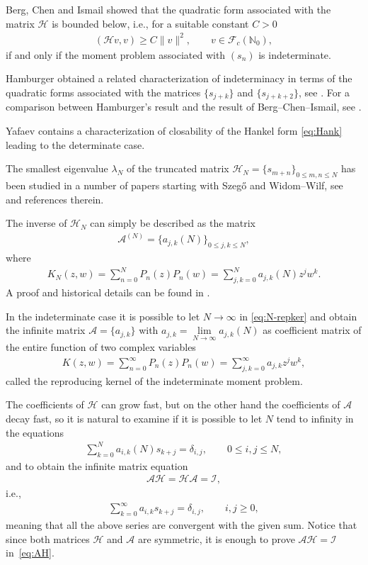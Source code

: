 \documentclass[11pt]{article}
\numberwithin{equation}{section}
\begin{document}
Berg, Chen and Ismail \cite{B:C:I} showed that the quadratic form associated with the matrix $\mathcal H$ is bounded below, i.e., for a suitable constant $C>0$
\begin{gather*}
(\mathcal{H}v,v)\ge C\|v\|^2,\qquad v\in \mathcal{F}_c(\mathbb{N}_0),
\end{gather*}
if and only if the moment problem associated with $(s_n)$ is indeterminate.

Hamburger obtained a related characterization of indeterminacy in terms of the quadratic forms associated with the matrices $\{s_{j+k}\}$ and $\{s_{j+k+2}\}$, see \cite[p.~70]{S:T}. For a comparison between Hamburger's result and the result of Berg--Chen--Ismail, see \cite{B:C:I}.

Yafaev \cite{Y} contains a characterization of closability of the Hankel form \eqref{eq:Hank} leading to the determinate case.

The smallest eigenvalue $\lambda_N$ of the truncated matrix $\mathcal{H}_N=\{s_{m+n}\}_{0\le m,n\le N}$ has been studied in a number of papers starting with Szeg\H{o} and Widom--Wilf, see~\cite{B:S1} and references therein.

The inverse of $\mathcal H_N$ can simply be described as the matrix
\begin{gather*}
\mathcal A^{(N)}=\{a_{j,k}(N)\}_{0\le j,k\le N},
\end{gather*}
where
\begin{gather}\label{eq:N-repker}
K_N(z,w)=\sum_{n=0}^NP_n(z)P_n(w)=\sum_{j,k=0}^N a_{j,k}(N)z^jw^k.
\end{gather}
A proof and historical details can be found in \cite[Theorem~1.1]{B:S1}.

In the indeterminate case it is possible to let $N\to \infty$ in \eqref{eq:N-repker} and obtain the infinite matrix $\mathcal A=\{a_{j,k}\}$ with $a_{j,k}=\lim\limits_{N\to\infty}a_{j,k}(N)$ as coefficient matrix of the entire function of two complex variables
\begin{gather*}
K(z,w)=\sum_{n=0}^\infty P_n(z)P_n(w)=\sum_{j,k=0}^\infty a_{j,k}z^jw^k,
\end{gather*}
called the reproducing kernel of the indeterminate moment problem.

The coefficients of $\mathcal H$ can grow fast, but on the other hand the coefficients of $\mathcal A$ decay fast, so it is natural to examine if it is possible to let $N$ tend to infinity in the equations
\begin{gather*}
\sum_{k=0}^N a_{i,k}(N)s_{k+j}=\delta_{i,j},\qquad 0\le i,j\le N,
\end{gather*}
and to obtain the infinite matrix equation
\begin{gather}\label{eq:AH}
\mathcal A\mathcal H=\mathcal H\mathcal A=\mathcal I,
\end{gather}
i.e.,
\begin{gather}\label{eq:AH1}
\sum_{k=0}^\infty a_{i,k}s_{k+j} =\delta_{i,j},\qquad i,j \ge 0,
\end{gather}
meaning that all the above series are convergent with the given sum.
Notice that since both matrices $\mathcal H$ and $\mathcal A$ are symmetric, it is enough to prove $\mathcal A\mathcal H=\mathcal I$ in~\eqref{eq:AH}.
\end{document}
